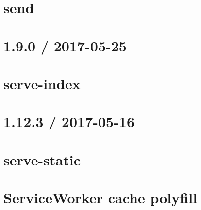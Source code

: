 \documentclass[twoside]{book}
\newcommand{\+}{\discretionary{\mbox{\scriptsize$\hookleftarrow$}}{}{}}
\begin{document}
\chapter{send}
\label{md__c_1_workspace_demo_src_main_script_node_modules_send__r_e_a_d_m_e}

\chapter{1.9.0 / 2017-\/05-\/25}
\label{md__c_1_workspace_demo_src_main_script_node_modules_serve-index__h_i_s_t_o_r_y}

\chapter{serve-\/index}
\label{md__c_1_workspace_demo_src_main_script_node_modules_serve-index__r_e_a_d_m_e}

\chapter{1.12.3 / 2017-\/05-\/16}
\label{md__c_1_workspace_demo_src_main_script_node_modules_serve-static__h_i_s_t_o_r_y}

\chapter{serve-\/static}
\label{md__c_1_workspace_demo_src_main_script_node_modules_serve-static__r_e_a_d_m_e}

\chapter{Service\+Worker cache polyfill}
\label{md__c_1_workspace_demo_src_main_script_node_modules_serviceworker-cache-polyfill__r_e_a_d_m_e}

\end{document}
